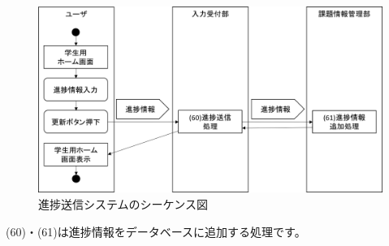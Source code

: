 \begin{figure}[htbp]
  \begin{center}
    \includegraphics[width=1\linewidth,clip]{./img/seq15.png}
    \caption{進捗送信システムのシーケンス図}\label{fig:seq15}
  \end{center}
\end{figure}

(60)・(61)は進捗情報をデータベースに追加する処理です。


